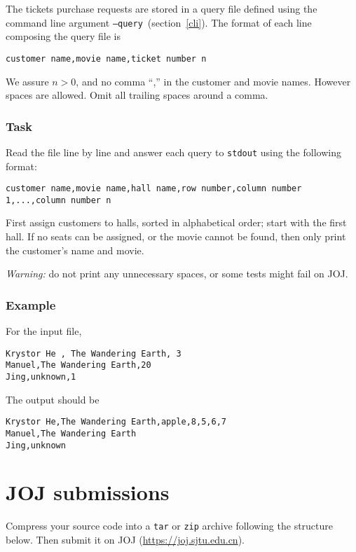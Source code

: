 \documentclass[11pt,a4paper]{article}
\begin{document}
The tickets purchase requests are stored in a query file defined using the command line argument {\tt --query}~(section~\ref{cli}). The format of each line composing the query file is
\begin{verbatim}
customer name,movie name,ticket number n
\end{verbatim}

We assure $n>0$, and no comma ``,'' in the customer and movie names. However spaces are allowed. Omit all trailing spaces around a comma.

\subsubsection*{Task}
Read the file line by line and answer each query to \texttt{stdout} using the following format:
\begin{verbatim}
customer name,movie name,hall name,row number,column number 1,...,column number n
\end{verbatim}

First assign customers to halls, sorted in alphabetical order; start with the first hall. If no seats can be assigned, or the movie cannot be found, then only print the customer's name and movie.\medskip  

{\em Warning:} do not print any unnecessary spaces, or some tests might fail on JOJ.\medskip 

\subsubsection*{Example}
For the input file,
\begin{verbatim}
Krystor He , The Wandering Earth, 3
Manuel,The Wandering Earth,20
Jing,unknown,1
\end{verbatim}

The output should be
\begin{verbatim}
Krystor He,The Wandering Earth,apple,8,5,6,7
Manuel,The Wandering Earth
Jing,unknown
\end{verbatim}

\section{JOJ submissions}

Compress your source code into a \texttt{tar} or \texttt{zip} archive following the structure below. Then submit it on JOJ (\url{https://joj.sjtu.edu.cn}).
\medskip
\end{document}
